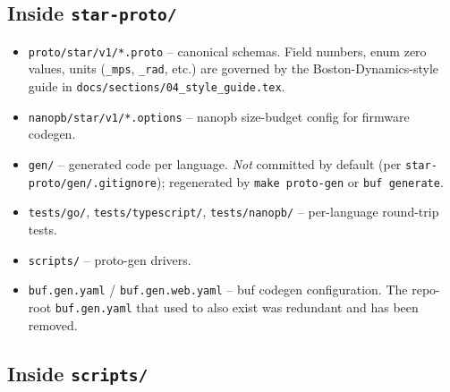 \subsection{Inside \texttt{star-proto/}}

\begin{itemize}
  \item \texttt{proto/star/v1/*.proto} -- canonical schemas. Field
        numbers, enum zero values, units (\texttt{\_mps},
        \texttt{\_rad}, etc.) are governed by the Boston-Dynamics-style
        guide in \texttt{docs/sections/04\_style\_guide.tex}.
  \item \texttt{nanopb/star/v1/*.options} -- nanopb size-budget config
        for firmware codegen.
  \item \texttt{gen/} -- generated code per language. \emph{Not}
        committed by default (per \texttt{star-proto/gen/.gitignore});
        regenerated by \texttt{make proto-gen} or \texttt{buf generate}.
  \item \texttt{tests/go/}, \texttt{tests/typescript/},
        \texttt{tests/nanopb/} -- per-language round-trip tests.
  \item \texttt{scripts/} -- proto-gen drivers.
  \item \texttt{buf.gen.yaml} / \texttt{buf.gen.web.yaml} -- buf
        codegen configuration. The repo-root \texttt{buf.gen.yaml} that
        used to also exist was redundant and has been removed.
\end{itemize}

\subsection{Inside \texttt{scripts/}}
\label{section:scripts-tree}


